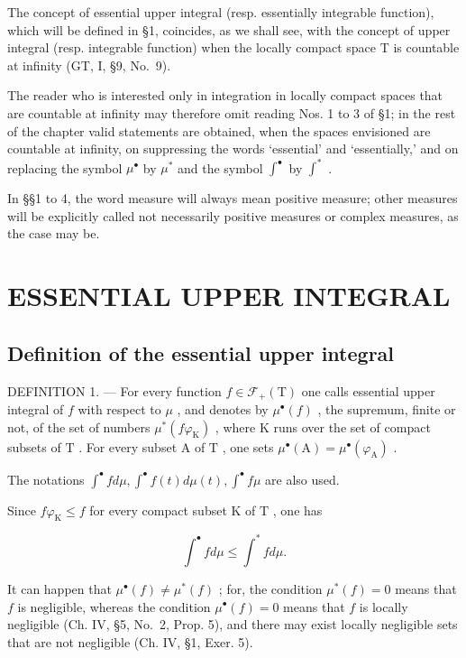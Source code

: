 The concept of essential upper integral (resp. essentially integrable function), which will be defined in §1, coincides, as we shall see, with the concept of upper integral (resp. integrable function) when the locally compact space T is countable at infinity (GT, I, §9, No.~9).

The reader who is interested only in integration in locally compact spaces that are countable at infinity may therefore omit reading Nos. 1 to 3 of §1; in the rest of the chapter valid statements are obtained, when the spaces envisioned are countable at infinity, on suppressing the words `essential' and `essentially,' and on replacing the symbol \(\mu^{\bullet}\) by \(\mu^{*}\) and the symbol \(\int^{\bullet}\) by \(\int^{*}\) .

In §§1 to 4, the word measure will always mean positive measure; other measures will be explicitly called not necessarily positive measures or complex measures, as the case may be.

\section{ESSENTIAL UPPER INTEGRAL}

\subsection{Definition of the essential upper integral}

DEFINITION 1. --- For every function \(f \in \mathcal{F}_{+}(\mathrm{T})\) one calls essential upper integral of \(f\) with respect to \(\mu\) , and denotes by \(\mu^{\bullet}(f)\) , the supremum, finite or not, of the set of numbers \(\mu^{*}(f\varphi_{\mathrm{K}})\) , where \(\mathrm{K}\) runs over the set of compact subsets of \(\mathrm{T}\) . For every subset \(\mathrm{A}\) of \(\mathrm{T}\) , one sets \(\mu^{\bullet}(\mathrm{A}) = \mu^{\bullet}(\varphi_{\mathrm{A}})\) .

The notations \(\int^{\bullet}f d\mu ,\int^{\bullet}f(t)d\mu (t),\int^{\bullet}f\mu\) are also used.

Since \(f\varphi_{\mathrm{K}} \leqslant f\) for every compact subset \(\mathrm{K}\) of \(\mathrm{T}\) , one has

\[
\int^ {\bullet} f d \mu \leqslant \int^ {*} f d \mu .\tag{1}
\]

It can happen that \(\mu^{\bullet}(f) \neq \mu^{*}(f)\) ; for, the condition \(\mu^{*}(f) = 0\) means that \(f\) is negligible, whereas the condition \(\mu^{\bullet}(f) = 0\) means that \(f\) is locally negligible (Ch. IV, §5, No.~2, Prop. 5), and there may exist locally negligible sets that are not negligible (Ch. IV, §1, Exer. 5).

